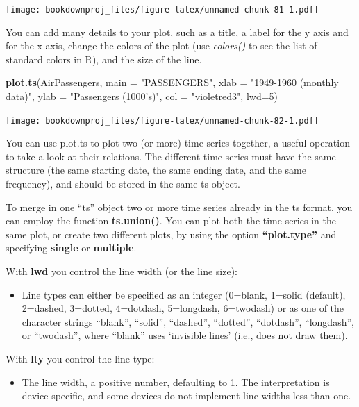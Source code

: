 \documentclass[
]{article}
\newenvironment{Shaded}{\begin{snugshade}}{\end{snugshade}}
\newcommand{\DataTypeTok}[1]{\textcolor[rgb]{0.13,0.29,0.53}{#1}}
\newcommand{\DecValTok}[1]{\textcolor[rgb]{0.00,0.00,0.81}{#1}}
\newcommand{\KeywordTok}[1]{\textcolor[rgb]{0.13,0.29,0.53}{\textbf{#1}}}
\newcommand{\NormalTok}[1]{#1}
\newcommand{\StringTok}[1]{\textcolor[rgb]{0.31,0.60,0.02}{#1}}
\providecommand{\tightlist}{%
  \setlength{\itemsep}{0pt}\setlength{\parskip}{0pt}}
\begin{document}
\texttt{[image: bookdownproj\_files/figure-latex/unnamed-chunk-81-1.pdf]}

You can add many details to your plot, such as a title, a label for the y axis and for the x axis, change the colors of the plot (use \emph{colors()} to see the list of standard colors in R), and the size of the line.

\begin{Shaded}
\begin{Highlighting}[]
\KeywordTok{plot.ts}\NormalTok{(AirPassengers, }
     \DataTypeTok{main =} \StringTok{"PASSENGERS"}\NormalTok{,}
     \DataTypeTok{xlab =} \StringTok{"1949-1960 (monthly data)"}\NormalTok{,}
     \DataTypeTok{ylab =} \StringTok{"Passengers (1000's)"}\NormalTok{,}
     \DataTypeTok{col =} \StringTok{"violetred3"}\NormalTok{, }
     \DataTypeTok{lwd=}\DecValTok{5}\NormalTok{)}
\end{Highlighting}
\end{Shaded}

\texttt{[image: bookdownproj\_files/figure-latex/unnamed-chunk-82-1.pdf]}

You can use plot.ts to plot two (or more) time series together, a useful operation to take a look at their relations. The different time series must have the same structure (the same starting date, the same ending date, and the same frequency), and should be stored in the same ts object.

To merge in one ``ts'' object two or more time series already in the ts format, you can employ the function \textbf{ts.union()}. You can plot both the time series in the same plot, or create two different plots, by using the option \textbf{``plot.type''} and specifying \textbf{single} or \textbf{multiple}.

With \textbf{lwd} you control the line width (or the line size):

\begin{itemize}
\tightlist
\item
  Line types can either be specified as an integer (0=blank, 1=solid (default), 2=dashed, 3=dotted, 4=dotdash, 5=longdash, 6=twodash) or as one of the character strings ``blank'', ``solid'', ``dashed'', ``dotted'', ``dotdash'', ``longdash'', or ``twodash'', where ``blank'' uses `invisible lines' (i.e., does not draw them).
\end{itemize}

With \textbf{lty} you control the line type:

\begin{itemize}
\tightlist
\item
  The line width, a positive number, defaulting to 1. The interpretation is device-specific, and some devices do not implement line widths less than one.
\end{itemize}
\end{document}
